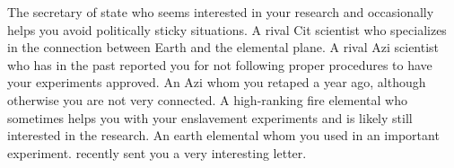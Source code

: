 \documentclass[char]{elementals}
\begin{document}
\begin{contacts}
  \contact{\cDema{}} The secretary of state who seems interested in your research and occasionally helps you avoid politically sticky situations.
	\contact{\cGD{}} A rival Cit scientist who specializes in the connection between Earth and the elemental plane.
	\contact{\cScientist{}} A rival Azi scientist who has in the past reported you for not following proper procedures to have your experiments approved.
	\contact{\cDiplomat{}} An Azi whom you retaped a year ago, although otherwise you are not very connected.
	\contact{\cPyro{}} A high-ranking fire elemental who sometimes helps you with your enslavement experiments and is likely still interested in the research.
	\contact{\cMinion{}} An earth elemental whom you used in an important experiment. \cMinion{\They} recently sent you a very interesting letter.
\end{contacts}
\end{document}
